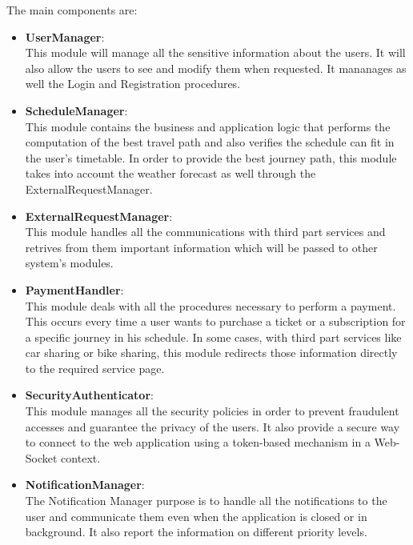 \documentclass[numbers=noenddot, 12pt, a4paper, oneside]{scrbook}
\begin{document}
The main components are:
\begin{itemize}
	\item \textbf{UserManager}:\\\newline
	This module will manage all the sensitive information about the users. It will also allow the users to see and modify them when requested. It mananages as well the Login and Registration procedures.\\

	\item \textbf{ScheduleManager}:\\\newline
	This module contains the business and application logic that performs the computation of the best travel path and also verifies the schedule can fit in the user's timetable. In order to provide the best journey path, this module takes into account the weather forecast as well through the ExternalRequestManager.\\

	\item \textbf{ExternalRequestManager}:\\\newline
	This module handles all the communications with third part services and retrives from them important information which will be passed to other system's modules. \\

	\item \textbf{PaymentHandler}:\\\newline
	This module deals with all the procedures necessary to perform a payment. This occurs every time a user wants to purchase a ticket or a subscription for a specific journey in his schedule. In some cases, with third part services like car sharing or bike sharing, this module redirects those information directly to the required service page.\\

	\item \textbf{SecurityAuthenticator}:\\\newline
	This module manages all the security policies in order to prevent fraudulent accesses and guarantee the privacy of the users. It also provide a secure way to connect to the web application using a token-based mechanism in a Web-Socket context. \\

	\item \textbf{NotificationManager}:\\\newline
	The Notification Manager purpose is to handle all the notifications to the user and communicate them even when the application is closed or in background. It also report the information on different priority levels.\\


\end{itemize}
\end{document}

